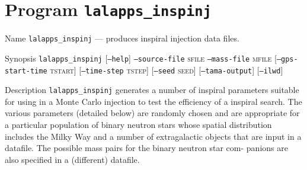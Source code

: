 \section{Program \texttt{lalapps\_inspinj}}
\label{program:lalapps-inspinj}

\begin{entry}
\item[Name]
\verb$lalapps_inspinj$ --- produces inspiral injection data files.

\item[Synopsis]
\verb$lalapps_inspinj$ \newline
%
[\texttt{--help}]\newline
\texttt{--source-file} \textsc{sfile} \newline
\texttt{--mass-file} \textsc{mfile}\newline
%
[\texttt{--gps-start-time} \textsc{tstart}]\newline
%
[\texttt{--time-step} \textsc{tstep}] \newline
%
[\texttt{--seed} \textsc{seed}]\newline
%
[\texttt{--tama-output}]\newline
%
[\texttt{--ilwd}]

\item[Description] 
\verb$lalapps_inspinj$
generates a number of inspiral  parameters suitable  for using in a Monte
Carlo injection to test the efficiency of a inspiral search.  The  various
parameters (detailed  below)  are randomly chosen and are appropriate for a
particular population of binary neutron stars  whose spatial  distribution
includes the Milky Way and a number of extragalactic objects that are  input
in  a  datafile.  The  possible  mass pairs for the binary neutron star com-
panions are also specified in a (different) datafile.


\end{entry}
